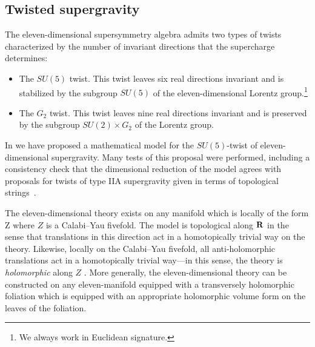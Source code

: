 \documentclass[../main.tex]{subfiles}
\begin{document}
\subsection{Twisted supergravity}

The eleven-dimensional supersymmetry algebra admits two types of twists characterized by the number of invariant directions that the supercharge determines:
\begin{itemize}
\item 
The $SU(5)$ twist. 
This twist leaves six real directions invariant and is stabilized by the subgroup $SU(5)$ of the eleven-dimensional Lorentz group.\footnote{We always work in Euclidean signature.}
\item 
The $G_2$ twist.
This twist leaves nine real directions invariant and is preserved by the subgroup $SU(2) \times G_2$ of the Lorentz group. 
\end{itemize}

In \cite{RSW} we have proposed a mathematical model for the $SU(5)$-twist of eleven-dimensional supergravity.
Many tests of this proposal were performed, including a consistency check that the dimensional reduction of the model agrees with proposals for twists of type IIA supergravity given in terms of topological strings~\cite{CLsugra}.

The eleven-dimensional theory exists on any manifold which is locally of the form 
\beqn\label{eqn:local}
\R \times Z
\eeqn
where $Z$ is a Calabi--Yau fivefold.
The model is topological along $\mathbf{R}$ in the sense that translations in this direction act in a homotopically trivial way on the theory.
Likewise, locally on the Calabi--Yau fivefold, all anti-holomorphic translations act in a homotopically trivial way---in this sense, the theory is {\em holomorphic} along $Z$ \cite{BWhol}.
More generally, the eleven-dimensional theory can be constructed on any eleven-manifold equipped with a transversely holomorphic foliation which is equipped with an appropriate holomorphic volume form on the leaves of the foliation.
\end{document}
